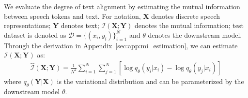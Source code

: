 
We evaluate the degree of text alignment by estimating the mutual information between speech tokens and text. 
For notation, $\mathbf{X}$ denotes discrete speech representations; $\mathbf{Y}$ denotes text; $\mathcal{I}(\mathbf{X};\mathbf{Y})$ denotes the mutual information; test dataset is denoted as $\mathcal{D} =\{(x_i, y_i)\}_{i=1}^{N}$ and $\theta$ denotes the downstream model. Through the derivation in Appendix~\ref{sec:app:mi_estimation}, we can estimate
$\mathcal{I}(\mathbf{X};\mathbf{Y})$ as:
\begin{align*}
    \mathcal{\hat{I}}(\mathbf{X};\mathbf{Y})=\frac{1}{N^2}\sum_{i=1}^{N}\sum_{j=1}^{N}[\log q_{\theta}(y_i|x_i)-\log q_{\theta}(y_j|x_i)]
\end{align*}
where $q_{\theta}(\mathbf{Y}|\mathbf{X})$ is the variational distribution and can be parameterized by the downstream model $\theta$.

 

